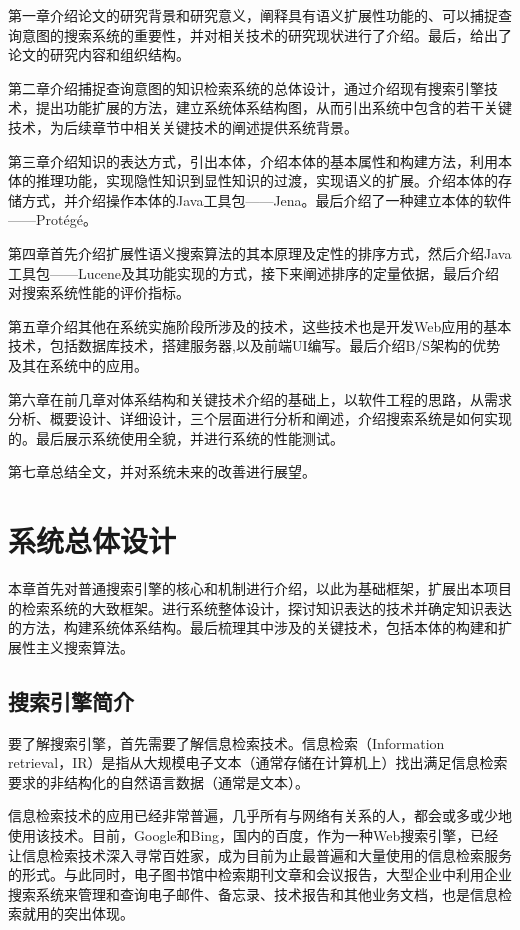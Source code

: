 \documentclass[12pt,a4paper]{article}
\begin{document}
	第一章介绍论文的研究背景和研究意义，阐释具有语义扩展性功能的、可以捕捉查询意图的搜索系统的重要性，并对相关技术的研究现状进行了介绍。最后，给出了论文的研究内容和组织结构。

	第二章介绍捕捉查询意图的知识检索系统的总体设计，通过介绍现有搜索引擎技术，提出功能扩展的方法，建立系统体系结构图，从而引出系统中包含的若干关键技术，为后续章节中相关关键技术的阐述提供系统背景。

	第三章介绍知识的表达方式，引出本体，介绍本体的基本属性和构建方法，利用本体的推理功能，实现隐性知识到显性知识的过渡，实现语义的扩展。介绍本体的存储方式，并介绍操作本体的Java工具包——Jena。最后介绍了一种建立本体的软件——Prot{\'e}g{\'e}。

	第四章首先介绍扩展性语义搜索算法的其本原理及定性的排序方式，然后介绍Java工具包——Lucene及其功能实现的方式，接下来阐述排序的定量依据，最后介绍对搜索系统性能的评价指标。

	第五章介绍其他在系统实施阶段所涉及的技术，这些技术也是开发Web应用的基本技术，包括数据库技术，搭建服务器,以及前端UI编写。最后介绍B/S架构的优势及其在系统中的应用。

	第六章在前几章对体系结构和关键技术介绍的基础上，以软件工程的思路，从需求分析、概要设计、详细设计，三个层面进行分析和阐述，介绍搜索系统是如何实现的。最后展示系统使用全貌，并进行系统的性能测试。

	第七章总结全文，并对系统未来的改善进行展望。
\newpage	
\section{系统总体设计}
\setcounter{figure}{0}
\setcounter{table}{0}
\setcounter{equation}{0}
	本章首先对普通搜索引擎的核心和机制进行介绍，以此为基础框架，扩展出本项目的检索系统的大致框架。进行系统整体设计，探讨知识表达的技术并确定知识表达的方法，构建系统体系结构。最后梳理其中涉及的关键技术，包括本体的构建和扩展性主义搜索算法。
	\subsection{搜索引擎简介}
	要了解搜索引擎，首先需要了解信息检索技术。信息检索（Information retrieval，IR）是指从大规模电子文本（通常存储在计算机上）找出满足信息检索要求的非结构化的自然语言数据（通常是文本）。\cite{23}
	
	信息检索技术的应用已经非常普遍，几乎所有与网络有关系的人，都会或多或少地使用该技术。目前，Google和Bing，国内的百度，作为一种Web搜索引擎，已经让信息检索技术深入寻常百姓家，成为目前为止最普遍和大量使用的信息检索服务的形式。与此同时，电子图书馆中检索期刊文章和会议报告，大型企业中利用企业搜索系统来管理和查询电子邮件、备忘录、技术报告和其他业务文档，也是信息检索就用的突出体现。
	
\end{document}
